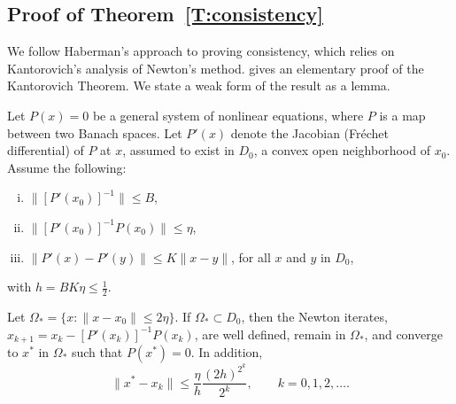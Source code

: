 \documentclass[final]{statsoc}
\begin{document}
\subsection{Proof of Theorem~\ref{T:consistency}}\label{S:proof-consistency}

We follow Haberman's \citeyearpar{haberman1977maximum} approach to proving
consistency, which relies on Kantorovich's \citeyearpar{kantorovich1952functional} analysis
of Newton's method.  \citet{tapia1971kantorovich} gives an elementary proof of the Kantorovich
Theorem.
We state a weak form of the result as a lemma.

\begin{lemma}\label{L:kantorovich}
    Let $P(x) = 0$ be a general system of nonlinear equations, where $P$ is
    a map between two Banach spaces.  Let $P'(x)$ denote the Jacobian
    (Fr\'echet differential) of $P$ at $x$, assumed to exist in $D_0$,
    a convex open neighborhood of $x_0$.  Assume the following:
    \begin{enumerate}[(i)]
        \item $\| [P'(x_0)]^{-1} \| \leq B$,
        \item $\| [P'(x_0)]^{-1} P(x_0) \| \leq \eta$,
        \item $\| P'(x) - P'(y) \| \leq K \| x - y \|$,\quad
            for all $x$ and $y$ in $D_0$,
    \end{enumerate}
    with $h = B K \eta \leq \tfrac{1}{2}$.

    Let $\Omega_\ast = \{ x : \| x - x_0 \| \leq 2 \eta \}$.
    If $\Omega_\ast \subset D_0$, then the Newton iterates,
    $x_{k+1} = x_k - [P'(x_k)]^{-1} P(x_k)$, are well defined, remain
    in $\Omega_\ast$, and converge to $x^\ast$ in $\Omega_\ast$ such
    that $P(x^\ast) = 0$.  In addition,
    \[
        \| x^\ast - x_k \|
            \leq
                \frac{\eta}{h}
                \frac{(2h)^{2^k}}{2^k},
        \qquad
        k = 0, 1, 2, \ldots.
    \]
\end{lemma}
\end{document}
